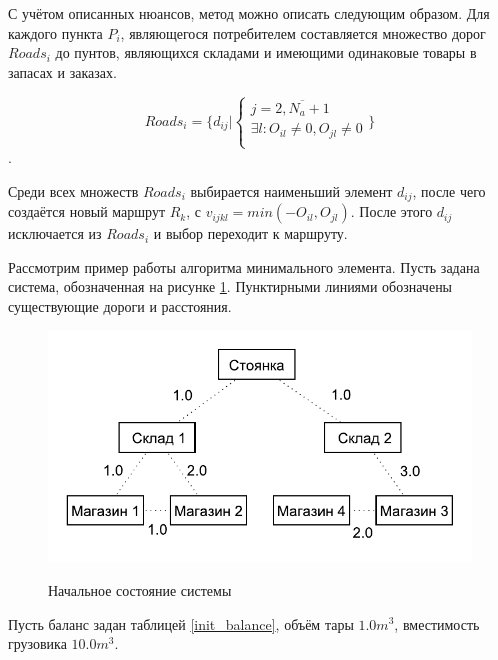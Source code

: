	С учётом описанных нюансов, метод можно описать следующим образом. Для каждого пункта $P_i$, являющегося потребителем составляется множество дорог $Roads_i$ до пунтов, являющихся складами и имеющими одинаковые товары в запасах и заказах. 
	
	\begin{equation}
		Roads_i = \{
			d_{ij} 
			| 
			\left\{ \begin{array}{ccc}	
				j = \overline{2, N_a + 1} \\
				\exists l: O_{il} \ne 0, O_{jl} \ne 0\\
			\end{array}	\right.
		\}
	\end{equation}.

	Среди всех множеств $Roads_i$ выбирается наименьший элемент $d_{ij}$, после чего создаётся новый маршрут $R_k$, с $v_{ijkl} = min(-O_{il}, O_{jl})$. После этого $d_{ij}$ исключается из $Roads_i$ и выбор переходит к маршруту.
	
	Рассмотрим пример работы алгоритма минимального элемента. Пусть задана система, обозначенная на рисунке \ref{pic:pre_1}. Пунктирными линиями обозначены существующие дороги и расстояния.
	
	\begin{figure}[h!] 
		\begin{center}
			{\includegraphics[scale=1.0, angle=0]{img/max_elem_1.pdf}}
			\caption{Начальное состояние системы}
			\label{pic:pre_1}
		\end{center}
	\end{figure}

	Пусть баланс задан таблицей \ref{init_balance}, объём тары $1.0 m^3$, вместимость грузовика $10.0 m^3$.
	
